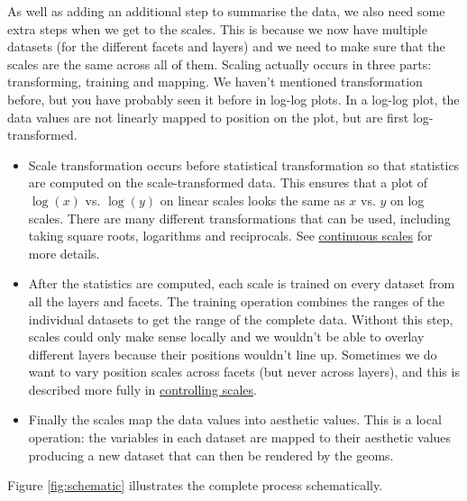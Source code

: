 As well as adding an additional step to summarise the data, we also need
some extra steps when we get to the scales. This is because we now have
multiple datasets (for the different facets and layers) and we need to
make sure that the scales are the same across all of them. Scaling
actually occurs in three parts: transforming, training and mapping. We
haven't mentioned transformation before, but you have probably seen it
before in log-log plots. In a log-log plot, the data values are not
linearly mapped to position on the plot, but are first log-transformed.

\begin{itemize}
\item
  Scale transformation occurs before statistical transformation so that
  statistics are computed on the scale-transformed data. This ensures
  that a plot of \(\log(x)\) vs. \(\log(y)\) on linear scales looks the
  same as \(x\) vs. \(y\) on log scales. There are many different
  transformations that can be used, including taking square roots,
  logarithms and reciprocals. See
  \hyperref[sub:scale-position]{continuous scales} for more details.
\item
  After the statistics are computed, each scale is trained on every
  dataset from all the layers and facets. The training operation
  combines the ranges of the individual datasets to get the range of the
  complete data. Without this step, scales could only make sense locally
  and we wouldn't be able to overlay different layers because their
  positions wouldn't line up. Sometimes we do want to vary position
  scales across facets (but never across layers), and this is described
  more fully in \hyperref[sub:controlling-scales]{controlling scales}.
\item
  Finally the scales map the data values into aesthetic values. This is
  a local operation: the variables in each dataset are mapped to their
  aesthetic values producing a new dataset that can then be rendered by
  the geoms.
\end{itemize}

Figure \ref{fig:schematic} illustrates the complete process
schematically.

